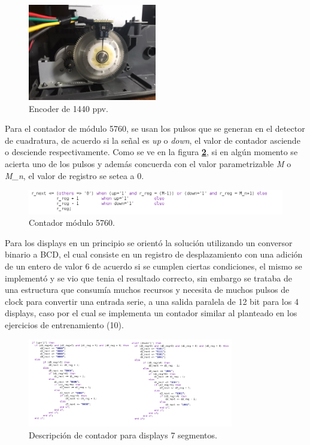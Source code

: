\documentclass[11pt, a4paper]{article}
\begin{document}
		\begin{figure}[H]
			\centering
			\includegraphics[width=0.5\textwidth]{Imagenes/encoder_real.jpeg}
			\caption{Encoder de 1440 ppv.}
			\label{fig:encoder_real}
		\end{figure} 

			Para el contador de módulo 5760, se usan los pulsos que se generan en el detector de cuadratura, de acuerdo si la señal es \textit{up} o \textit{down}, el valor de contador asciende o desciende respectivamente. Como se ve en la figura \textcolor{blue}{\textbf{\ref{fig:M}}}, si en algún momento se acierta uno de los pulsos y además concuerda con el valor parametrizable \textit{M} o \textit{M\_n}, el valor de registro se setea a 0.

		\begin{figure}[H]
			\centering
			\includegraphics[width=\textwidth]{Imagenes/mod5760.png}
			\caption{Contador módulo 5760.}
			\label{fig:M}
		\end{figure} 

		Para los displays en un principio se orientó la solución utilizando un conversor binario a BCD, el cual consiste en un registro de desplazamiento con una adición de un entero de valor 6 de acuerdo si se cumplen ciertas condiciones, el mismo se implementó y se vio que tenia el resultado correcto, sin embargo se trataba de una estructura que consumía muchos recursos y necesita de muchos pulsos de clock para convertir una entrada serie, a una salida paralela de 12 bit para los 4 displays, caso por el cual se implementa un contador similar al planteado en los ejercicios de entrenamiento (10).

		\begin{figure}[H]
			\centering
			\includegraphics[width=0.8\textwidth]{Imagenes/updown.png}
			\caption{Descripción de contador para displays 7 segmentos.}
			\label{fig:updown}
		\end{figure} 
		
\end{document}
